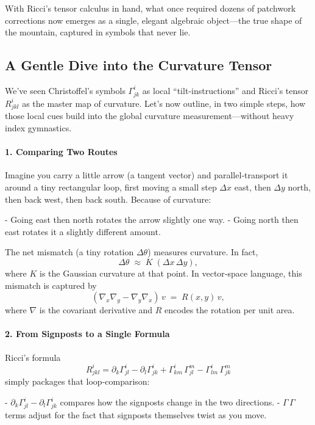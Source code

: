 With Ricci’s tensor calculus in hand, what once required dozens of patchwork corrections now emerges as a single, elegant algebraic object—the true shape of the mountain, captured in symbols that never lie.  



\subsection{A Gentle Dive into the Curvature Tensor}

We’ve seen Christoffel’s symbols \(\Gamma^i_{jk}\) as local “tilt‐instructions” and Ricci’s tensor \(R^i_{jkl}\) as the master map of curvature.  Let’s now outline, in two simple steps, how those local cues build into the global curvature measurement—without heavy index gymnastics.

\paragraph{1. Comparing Two Routes}
Imagine you carry a little arrow (a tangent vector) and parallel‐transport it around a tiny rectangular loop, first moving a small step \(\Delta x\) east, then \(\Delta y\) north, then back west, then back south.  Because of curvature:

- Going east then north rotates the arrow slightly one way.
- Going north then east rotates it a slightly different amount.

The net mismatch (a tiny rotation \(\Delta\theta\)) measures curvature.  In fact,
\[
\Delta\theta \;\approx\; K\;(\Delta x\,\Delta y),
\]
where \(K\) is the Gaussian curvature at that point.  In vector‐space language, this mismatch is captured by
\[
(\nabla_x\nabla_y - \nabla_y\nabla_x)\,v
\;=\;
R(x,y)\,v,
\]
where \(\nabla\) is the covariant derivative and \(R\) encodes the rotation per unit area.

\paragraph{2. From Signposts to a Single Formula}
Ricci’s formula
\[
R^i_{jkl}
=\partial_k\Gamma^i_{jl}
-\partial_l\Gamma^i_{jk}
+\Gamma^i_{km}\,\Gamma^m_{jl}
-\Gamma^i_{lm}\,\Gamma^m_{jk}
\]
simply packages that loop‐comparison:

- \(\partial_k\Gamma^i_{jl} - \partial_l\Gamma^i_{jk}\) compares how the signposts change in the two directions.
- \(\Gamma\,\Gamma\) terms adjust for the fact that signposts themselves twist as you move.

